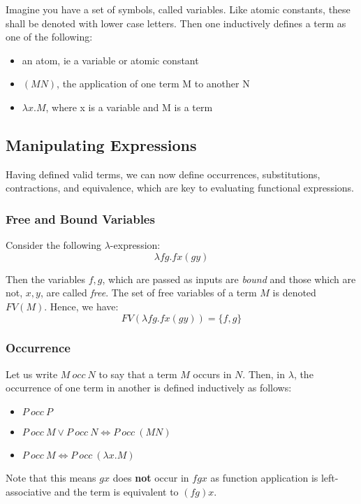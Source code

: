 Imagine you have a set of symbols, called variables. Like atomic constants, these shall be denoted with lower case letters. Then one inductively defines a term as one of the following:
\begin{itemize}
    \item an atom, ie a variable or atomic constant
    \item $(MN)$, the application of one term M to another N
    \item $\lambda x.M$, where x is a variable and M is a term
\end{itemize}

\subsection{Manipulating Expressions}
Having defined valid terms, we can now define occurrences, substitutions, contractions, and equivalence, which are key to evaluating functional expressions.

\subsubsection{Free and Bound Variables}
Consider the following $\lambda$-expression:
\begin{equation*}
    \lambda fg.fx(gy)
\end{equation*}

Then the variables $f, g$, which are passed as inputs are {\it bound} and those which are not, $x, y$, are called {\it free}\cite{LambdaAndCombinatorsIntro}. The set of free variables of a term $M$ is denoted $FV(M)$. Hence, we have:
\begin{equation*}
    FV(\lambda fg.fx(gy)) = \{f, g\}
\end{equation*}

\subsubsection{Occurrence}
Let us write $M\ occ\ N$ to say that a term $M$ occurs in $N$. Then, in $\lambda$, the occurrence of one term in another is defined inductively as follows:
\begin{itemize}
    \item $P\ occ\ P$
    \item $P\ occ\ M \lor  P\ occ\ N \iff P\ occ\ (MN)$
    \item $P\ occ\ M \iff P\ occ\ (\lambda x.M)$
\end{itemize}
Note that this means $gx$ does \textbf{not} occur in $fgx$ as function application is left-associative and the term is equivalent to $(fg)x$.

